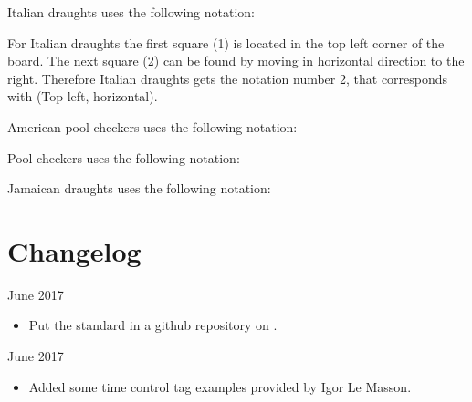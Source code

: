 \documentclass[letterpaper,10pt,english]{sphinxmanual}
\begin{document}
\sphinxAtStartPar
Italian draughts uses the following notation:
\begin{quote}

\noindent{}
\end{quote}

\sphinxAtStartPar
For Italian draughts the first square (1) is located in the top left corner of
the board. The next square (2) can be found by moving in horizontal direction
to the right. Therefore Italian draughts gets the notation number 2, that
corresponds with (Top left, horizontal).

\sphinxAtStartPar
American pool checkers uses the following notation:
\begin{quote}

\noindent{}
\end{quote}

\sphinxAtStartPar
Pool checkers uses the following notation:
\begin{quote}

\noindent{}
\end{quote}

\sphinxAtStartPar
Jamaican draughts uses the following notation:
\begin{quote}

\noindent{}
\end{quote}

\sphinxstepscope


\chapter{Changelog}
\label{\detokenize{changelog:changelog}}\label{\detokenize{changelog::doc}}
 June 2017
\begin{itemize}
\item {} 
\sphinxAtStartPar
Put the standard in a github repository on .

\end{itemize}

 June 2017
\begin{itemize}
\item {} 
\sphinxAtStartPar
Added some time control tag examples provided by Igor Le Masson.

\end{itemize}
\end{document}
